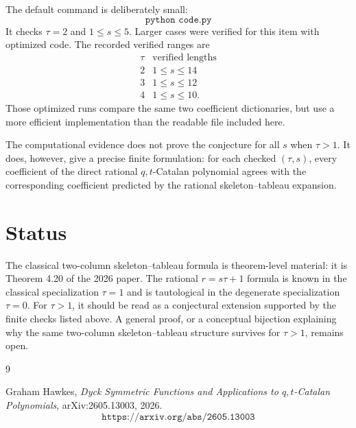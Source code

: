 \documentclass{article}
\begin{document}
The default command is deliberately small:
\[
  \texttt{python code.py}
\]
It checks \(\tau=2\) and \(1\le s\le5\).  Larger cases were verified for this
item with optimized code.  The recorded verified ranges are
\[
\begin{array}{c|c}
\tau & \text{verified lengths}\\
\hline
2 & 1\le s\le14\\
3 & 1\le s\le12\\
4 & 1\le s\le10.
\end{array}
\]
Those optimized runs compare the same two coefficient dictionaries, but use a
more efficient implementation than the readable file included here.

The computational evidence does not prove the conjecture for all \(s\) when
\(\tau>1\).  It does, however, give a precise finite formulation: for each
checked \((\tau,s)\), every coefficient of the direct rational
\(q,t\)-Catalan polynomial agrees with the corresponding coefficient predicted
by the rational skeleton--tableau expansion.

\section{Status}

The classical two-column skeleton--tableau formula is theorem-level material:
it is Theorem 4.20 of the 2026 paper.  The rational \(r=s\tau+1\) formula is
known in the classical specialization \(\tau=1\) and is tautological in the
degenerate specialization \(\tau=0\).  For \(\tau>1\), it should be read as a
conjectural extension supported by the finite checks listed above.  A general
proof, or a conceptual bijection explaining why the same two-column
skeleton--tableau structure survives for \(\tau>1\), remains open.

\begin{thebibliography}{9}

Graham Hawkes,
\emph{Dyck Symmetric Functions and Applications to \(q,t\)-Catalan Polynomials},
arXiv:2605.13003, 2026.
\[
  \texttt{https://arxiv.org/abs/2605.13003}
\]

\end{thebibliography}
\end{document}
